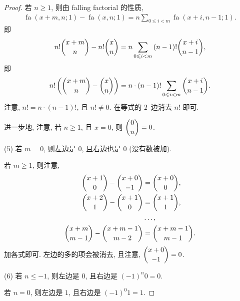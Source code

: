 \documentclass[../libro.tex]{subfiles}
\begin{document}
\begin{proof}
    若 \(n \geq 1\), 则由 falling factorial 的性质,
    \begin{align*}
        \operatorname{fa} {(x + m, n; 1)}
        - \operatorname{fa} {(x, n; 1)}
        = n \sum_{0 \leq i < m}
        {\operatorname{fa} {(x + i, n-1; 1)}}.
    \end{align*}
    即
    \begin{align*}
        n! \dbinom{x + m}{n}
        - n! \dbinom{x}{n}
        = n \sum_{0 \leq i < m} {(n-1)! \dbinom{x + i}{n-1}},
    \end{align*}
    即
    \begin{align*}
        n! \left(\dbinom{x + m}{n} - \dbinom{x}{n}\right)
        = n \cdot (n-1)!  \sum_{0 \leq i < m} {\dbinom{x + i}{n-1}}.
    \end{align*}
    注意, \(n! = n \cdot (n-1)!\), 且 \(n! \neq 0\).
    在等式的 \(2\)~边消去 \(n!\) 即可.

    进一步地, 注意,
    若 \(n \geq 1\), 且 \(x = 0\),
    则 \(\dbinom{0}{n} = 0\).

    (5)
    若 \(m = 0\), 则左边是 \(0\), 且右边也是 \(0\)
    (没有数被加).

    若 \(m \geq 1\), 则注意,
    \begin{align*}
        \dbinom{x+1}{0} - \dbinom{x+0}{-1}
        & = \dbinom{x+0}{0},
        \\
        \dbinom{x+2}{1} - \dbinom{x+1}{0}
        & = \dbinom{x+1}{1},
        \\
        & \dots,
        \\
        \dbinom{x+m}{m-1} - \dbinom{x+m-1}{m-2}
        & = \dbinom{x+m-1}{m-1}.
    \end{align*}
    加各式即可.
    左边的多的项会被消去,
    且注意, \(\dbinom{x+0}{-1} = 0\).

    (6)
    若 \(n \leq -1\), 则左边是 \(0\),
    且右边是 \((-1)^n 0 = 0\).

    若 \(n = 0\), 则左边是 \(1\),
    且右边是 \((-1)^0 1 = 1\).


\end{proof}
\end{document}
